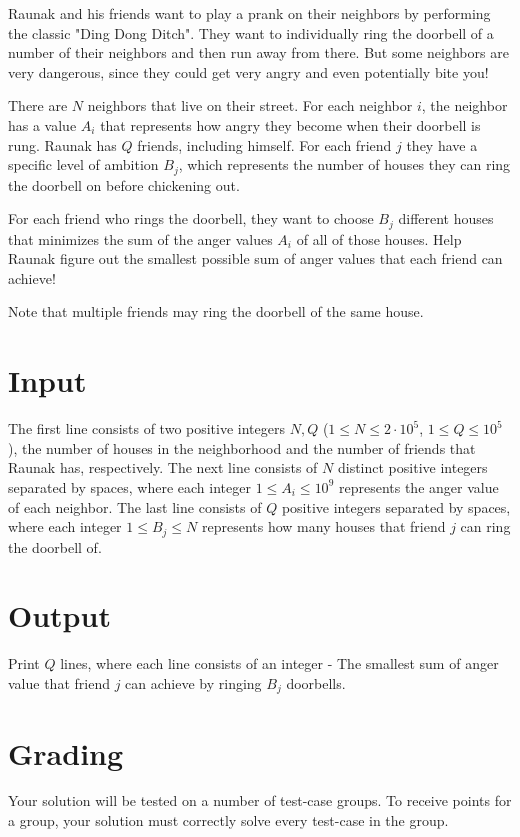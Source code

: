 \noindent
Raunak and his friends want to play a prank on their neighbors by performing the classic "Ding Dong Ditch". 
They want to individually ring the doorbell of a number of their neighbors and then run away from there. 
But some neighbors are very dangerous, since they could get very angry and even potentially bite you!


\noindent
There are $N$ neighbors that live on their street.
For each neighbor $i$, the neighbor has a value $A_i$ that represents how angry they become when their doorbell is rung.
Raunak has $Q$ friends, including himself. For each friend $j$ they have a specific level of ambition $B_j$, which represents the number of houses they can ring the doorbell on before chickening out.


\noindent
For each friend who rings the doorbell, they want to choose $B_j$ different houses that minimizes the sum of the anger values $A_i$ of all of those houses. 
Help Raunak figure out the smallest possible sum of anger values that each friend can achieve!


\noindent
Note that multiple friends may ring the doorbell of the same house.


\section*{Input}
\noindent
The first line consists of two positive integers $N, Q$ ($1 \leqslant N \leqslant 2 \cdot 10^5$, $1 \leqslant Q \leqslant 10^5$), the number of houses in the neighborhood and the number of friends that Raunak has, respectively.
The next line consists of $N$ distinct positive integers separated by spaces, where each integer $1 \leqslant A_i \leqslant 10^9$ represents the anger value of each neighbor.
The last line consists of $Q$ positive integers separated by spaces, where each integer $1 \leqslant B_j \leqslant N$ represents how many houses that friend $j$ can ring the doorbell of.


\section*{Output}
\noindent
Print $Q$ lines, where each line consists of an integer - The smallest sum of anger value that friend $j$ can achieve by ringing $B_j$ doorbells. 



\section*{Grading}
\noindent
Your solution will be tested on a number of test-case groups.
\noindent
To receive points for a group, your solution must correctly solve every test-case in the group.

